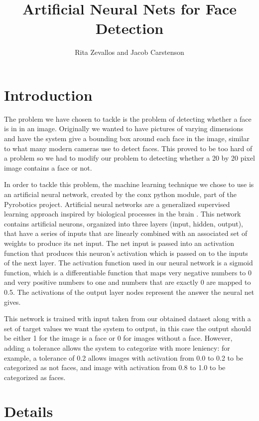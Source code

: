 \documentclass[11pt]{article}
\title{Artificial Neural Nets for Face Detection}
\author{Rita Zevallos and Jacob Carstenson}
\begin{document}
\maketitle

\section{Introduction}



The problem we have chosen to tackle is the problem of detecting whether a face is in in an image. Originally we wanted to have pictures of varying dimensions and have the system give a bounding box around each face in the image, similar to what many modern cameras use to detect faces. This proved to be too hard of a problem so we had to modify our problem to detecting whether a 20 by 20 pixel image contains a face or not.

In order to tackle this problem, the machine learning technique we chose to use is an artificial neural network, created by the conx python module, part of the Pyrobotics project. Artificial neural networks are a generalized supervised learning approach inspired by biological processes in the brain \cite{mitchell1997machine}. This network contains artificial neurons, organized into three layers (input, hidden, output), that have a series of inputs that are linearly combined with an associated set of weights to produce its net input. The net input is passed into an activation function that produces this neuron's activation which is passed on to the inputs of the next layer. The activation function used in our neural network is a sigmoid function, which is a differentiable function that maps very negative numbers to 0 and very positive numbers to one and numbers that are exactly 0 are mapped to 0.5. The activations of the output layer nodes represent the answer the neural net gives.

This network is trained with input taken from our obtained dataset along with a set of target values we want the system to output, in this case the output should be either 1 for the image is a face or 0 for images without a face. However, adding a tolerance allows the system to categorize with more leniency: for example, a tolerance of 0.2 allows images with activation from 0.0 to 0.2 to be categorized as not faces, and image with activation from 0.8 to 1.0 to be categorized as faces.


\section{Details}
\end{document}
